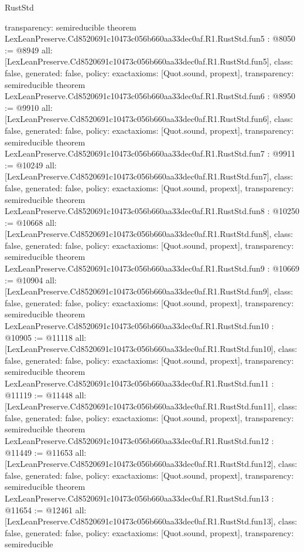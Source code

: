 \begin{lexlean}{RustStd}
\begin{coremodule}
{  transparency: semireducible
}
theorem LexLeanPreserve.Cd8520691c10473c056b660aa33dec0af.R1.RustStd.fun5 : @8050 := @8949 {
  all: [LexLeanPreserve.Cd8520691c10473c056b660aa33dec0af.R1.RustStd.fun5],
  class: false,
  generated: false,
  policy: exact{axioms: [Quot.sound, propext]},
  transparency: semireducible
}
theorem LexLeanPreserve.Cd8520691c10473c056b660aa33dec0af.R1.RustStd.fun6 : @8950 := @9910 {
  all: [LexLeanPreserve.Cd8520691c10473c056b660aa33dec0af.R1.RustStd.fun6],
  class: false,
  generated: false,
  policy: exact{axioms: [Quot.sound, propext]},
  transparency: semireducible
}
theorem LexLeanPreserve.Cd8520691c10473c056b660aa33dec0af.R1.RustStd.fun7 : @9911 := @10249 {
  all: [LexLeanPreserve.Cd8520691c10473c056b660aa33dec0af.R1.RustStd.fun7],
  class: false,
  generated: false,
  policy: exact{axioms: [Quot.sound, propext]},
  transparency: semireducible
}
theorem LexLeanPreserve.Cd8520691c10473c056b660aa33dec0af.R1.RustStd.fun8 : @10250 := @10668 {
  all: [LexLeanPreserve.Cd8520691c10473c056b660aa33dec0af.R1.RustStd.fun8],
  class: false,
  generated: false,
  policy: exact{axioms: [Quot.sound, propext]},
  transparency: semireducible
}
theorem LexLeanPreserve.Cd8520691c10473c056b660aa33dec0af.R1.RustStd.fun9 : @10669 := @10904 {
  all: [LexLeanPreserve.Cd8520691c10473c056b660aa33dec0af.R1.RustStd.fun9],
  class: false,
  generated: false,
  policy: exact{axioms: [Quot.sound, propext]},
  transparency: semireducible
}
theorem LexLeanPreserve.Cd8520691c10473c056b660aa33dec0af.R1.RustStd.fun10 : @10905 := @11118 {
  all: [LexLeanPreserve.Cd8520691c10473c056b660aa33dec0af.R1.RustStd.fun10],
  class: false,
  generated: false,
  policy: exact{axioms: [Quot.sound, propext]},
  transparency: semireducible
}
theorem LexLeanPreserve.Cd8520691c10473c056b660aa33dec0af.R1.RustStd.fun11 : @11119 := @11448 {
  all: [LexLeanPreserve.Cd8520691c10473c056b660aa33dec0af.R1.RustStd.fun11],
  class: false,
  generated: false,
  policy: exact{axioms: [Quot.sound, propext]},
  transparency: semireducible
}
theorem LexLeanPreserve.Cd8520691c10473c056b660aa33dec0af.R1.RustStd.fun12 : @11449 := @11653 {
  all: [LexLeanPreserve.Cd8520691c10473c056b660aa33dec0af.R1.RustStd.fun12],
  class: false,
  generated: false,
  policy: exact{axioms: [Quot.sound, propext]},
  transparency: semireducible
}
theorem LexLeanPreserve.Cd8520691c10473c056b660aa33dec0af.R1.RustStd.fun13 : @11654 := @12461 {
  all: [LexLeanPreserve.Cd8520691c10473c056b660aa33dec0af.R1.RustStd.fun13],
  class: false,
  generated: false,
  policy: exact{axioms: [Quot.sound, propext]},
  transparency: semireducible
}
\end{coremodule}
\end{lexlean}
